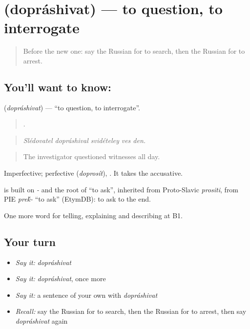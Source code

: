 \section[\texorpdfstring{\ru{допрашивать} (dopráshivat)}{допрашивать (dopráshivat)}]{ (dopráshivat) — to question, to interrogate}

\label{lesson:RU-C292-doprashivat}



\begin{quote}
Before the new one: say the Russian for to search, then the Russian for to arrest.
\end{quote}

\subsection*{You'll want to know: }
\textbf{} (\emph{dopráshivat}) — \textquotedblleft{}to question, to interrogate\textquotedblright{}.

\begin{quote}
    .
\end{quote}

\begin{quote}
\emph{Slédovatel dopráshival svidételey ves den.}
\end{quote}

\begin{quote}
The investigator questioned witnesses all day.
\end{quote}

Imperfective; perfective \emph{} (\emph{doprosít}), \emph{}. It takes the accusative.

\begin{cousinweb}
\emph{} is built on \emph{-} and the root of \emph{} \textquotedblleft{}to ask\textquotedblright{}, inherited from Proto-Slavic \emph{prositi}, from PIE \emph{pre\'{k}-} \textquotedblleft{}to ask\textquotedblright{} (EtymDB): to ask to the end.
\end{cousinweb}

\begin{grammarlens}[title={What you've built}]
One more word for telling, explaining and describing at B1.
\end{grammarlens}

\subsection*{Your turn}
\begin{itemize}
\raggedright
  \item \emph{Say it:} \emph{dopráshivat}
  \item \emph{Say it:} \emph{dopráshivat}, once more
  \item \emph{Say it:} a sentence of your own with \emph{dopráshivat}
  \item \emph{Recall:} say the Russian for to search, then the Russian for to arrest, then say \emph{dopráshivat} again
\end{itemize}

